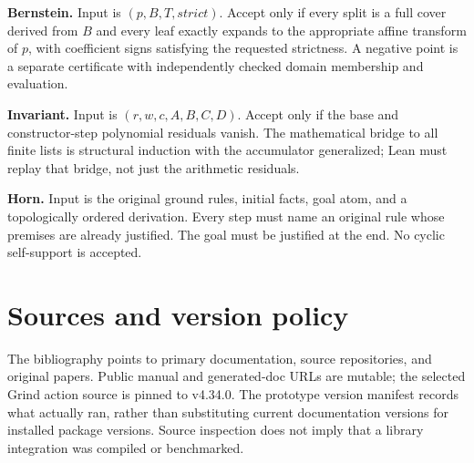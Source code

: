 \documentclass[11pt,a4paper]{article}
\begin{document}
\textbf{Bernstein.} Input is $(p,B,T,\mathit{strict})$. Accept only if every split is a full cover derived from $B$ and every leaf exactly expands to the appropriate affine transform of $p$, with coefficient signs satisfying the requested strictness. A negative point is a separate certificate with independently checked domain membership and evaluation.

\textbf{Invariant.} Input is $(r,w,c,A,B,C,D)$. Accept only if the base and constructor-step polynomial residuals vanish. The mathematical bridge to all finite lists is structural induction with the accumulator generalized; Lean must replay that bridge, not just the arithmetic residuals.

\textbf{Horn.} Input is the original ground rules, initial facts, goal atom, and a topologically ordered derivation. Every step must name an original rule whose premises are already justified. The goal must be justified at the end. No cyclic self-support is accepted.

\section{Sources and version policy}
The bibliography points to primary documentation, source repositories, and original papers. Public manual and generated-doc URLs are mutable; the selected Grind action source is pinned to v4.34.0. The prototype version manifest records what actually ran, rather than substituting current documentation versions for installed package versions. Source inspection does not imply that a library integration was compiled or benchmarked.
\end{document}
